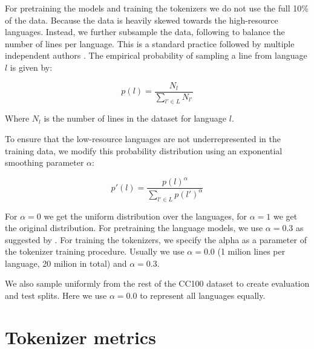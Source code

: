 For pretraining the models and training the tokenizers we do not use the full 10\% of the data. Because the data is heavily skewed towards the high-resource languages. Instead, we further subsample the data, following \citet{conneau_unsupervised_2020-1} to balance the number of lines per language. This is a standard practice followed by multiple independent authors . The empirical probability of sampling a line from language $l$ is given by:

\begin{equation}
    p(l) = \frac{N_l}{\sum_{l' \in L} N_{l'}}
\end{equation}

Where $N_l$ is the number of lines in the dataset for language $l$.

To ensure that the low-resource languages are not underrepresented in the training data, we modify this probability distribution using an exponential smoothing parameter $\alpha$:

\begin{equation}
    p'(l) = \frac{p(l)^\alpha}{\sum_{l' \in L} p(l')^\alpha}
\end{equation}

For $\alpha = 0$ we get the uniform distribution over the languages, for $\alpha = 1$ we get the original distribution. For pretraining the language models, we use $\alpha = 0.3$ as suggested by \citet{conneau_unsupervised_2020-1}. For training the tokenizers, we specify the alpha as a parameter of the tokenizer training procedure. Usually we use $\alpha = 0.0$ (1 milion lines per language, 20 milion in total) and $\alpha = 0.3$.

We also sample uniformly from the rest of the CC100 dataset to create evaluation and test splits. Here we use $\alpha = 0.0$ to represent all languages equally.

\section{Tokenizer metrics}



